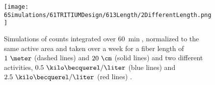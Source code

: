 \begin{figure}[h]
\centering
\texttt{[image: 6Simulations/61TRITIUMDesign/613Length/2DifferentLength.png]}
\caption{Simulations of counts integrated over $60~\min$, normalized to the same active area and taken over a week for a fiber length of $1~\meter$ (dashed lines) and $20~\cm$ (solid lines) and two different activities, $0.5~\kilo\becquerel/\liter$ (blue lines) and $2.5~\kilo\becquerel/\liter$ (red lines) \cite{SimulationPaperCarlos}. \label{fig:CountsOver60minDifferentLength}}
\end{figure}

